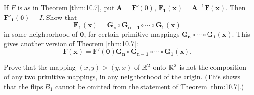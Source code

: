 \begin{myexercise}
    \label{ex:10.3}
    \begin{asparaenum}[(a)]
        \item If $F$ is as in Theorem \ref{thm:10.7}, put 
        $\mathbf{A} = \mathbf{F}'(0)$,
        $\mathbf{F_{1}(x)} = \mathbf{A^{-1}F(x)}$.
        Then $\mathbf{F'_1(0)}=I$.
        Show that 
        \begin{equation*}
            \mathbf{F_1(x) = G_n \circ G_{n-1} \circ \cdots \circ G_1(x)}
        \end{equation*}
        in some neighborhood of $\mathbf{0}$,
        for certain primitive mappings $\mathbf{G_n \circ \cdots \circ G_1(x)}$.
        This gives another version of Theorem \ref{thm:10.7}:
        \begin{equation*}
            \mathbf{F(x) = F'(0) G_n \circ G_{n-1} \circ \cdots \circ G_1(x)}.
        \end{equation*}
        \item Prove that the mapping $(x, y) > (y, x)$ of ${\protect\mathbb R}^2$ onto ${\protect\mathbb R}^2$ is not the composition of any two primitive mappings, in any neighborhood of the origin. 
        (This shows that the flips $B_1$ cannot be omitted from the statement of Theorem \ref{thm:10.7}.)
    \end{asparaenum}
\end{myexercise}